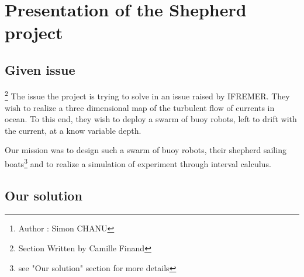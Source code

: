 \documentclass[a4paper]{report}
\begin{document}
\begin{abstract}

	\footnote{Author : Simon CHANU} The SHEPHERD Project aims to command a swarm of robotic oceanographic buoys by the astute use of the different directions of the current at along the water column, with the help of an acoustic localization system provided by robotic sailboats acting as shepherds. This paper describes the simulation created to validate the foundations of the project. This simulation uses simple models and equations to effectively command a swarm of robots.

\end{abstract}

\tableofcontents

\newpage

\listoffigures
\thispagestyle{empty}
\setcounter{page}{0}

\newpage

\renewcommand{\arraystretch}{1.5}


~
\thispagestyle{empty}
\setcounter{page}{0}
\newpage

\chapter{Presentation of the Shepherd project}
\section{Given issue}
\footnote{Section Written by Camille Finand}
The issue the project is trying to solve in an issue raised by IFREMER. They wish to realize a three dimensional map of the turbulent flow of currents in ocean. To this end, they wish to deploy a swarm of buoy robots, left to drift with the current, at a know variable depth.

Our mission was to design such a swarm of buoy robots, their shepherd sailing boats\footnote{see "Our solution" section for more details} and to realize a simulation of experiment through interval calculus.


\section{Our solution}
\end{document}
